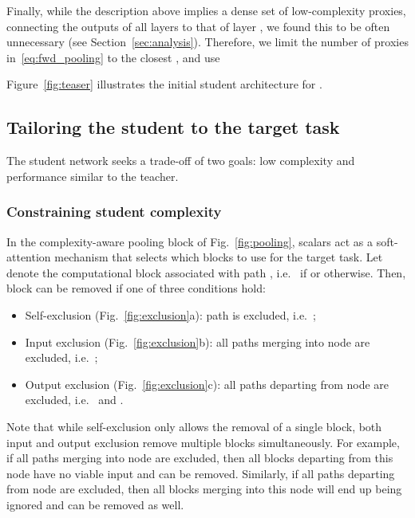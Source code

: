 \documentclass[10pt,twocolumn,letterpaper]{article}
\begin{document}
Finally, while the description above implies a dense set of low-complexity proxies, connecting the outputs of all layers  to that of layer , we found this to be often unnecessary (see Section~\ref{sec:analysis}). Therefore, we limit the number of proxies in~\eqref{eq:fwd_pooling} to the closest , and use

Figure~\ref{fig:teaser} illustrates the initial student architecture for .

\subsection{Tailoring the student to the target task}
\vspace{-3pt}



The student network seeks a trade-off of two goals: low complexity and performance similar to the teacher. 


\vspace{-7pt}
\subsubsection{Constraining student complexity}
\vspace{-3pt}
\label{sec:complexity}

In the complexity-aware pooling block of Fig.~\ref{fig:pooling}, scalars  act as a soft-attention mechanism that selects which blocks to use for the target task.
Let  denote the computational block associated with path , i.e.~ if  or  otherwise. Then, block  can be removed if one of three conditions hold:
\begin{itemize}
    \itemsep-1pt
\item Self-exclusion (Fig.~\ref{fig:exclusion}a): path  is excluded, i.e.~;
    \item Input exclusion (Fig.~\ref{fig:exclusion}b): all paths merging into node  are excluded, i.e.~;
    \item Output exclusion (Fig.~\ref{fig:exclusion}c): all paths departing from node  are excluded, i.e.~ and .
\end{itemize}
Note that while self-exclusion only allows the removal of a single block, both input and output exclusion remove multiple blocks simultaneously. 
For example, if all paths merging into node  are excluded, then all blocks departing from this node have no viable input and can be removed. 
Similarly, if all paths departing from node  are excluded, then all blocks merging into this node will end up being ignored and can be removed as well.
\end{document}
